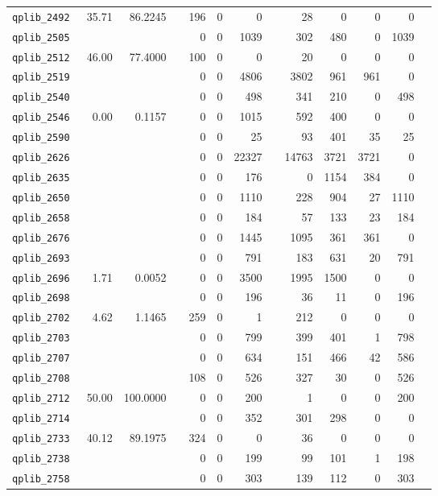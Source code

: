 \begin{longtable}{lrrrrrrrrrrrr}
{\tt 	qplib\_2492	}	&	35.71	&	86.2245	&	&	196	&	0	&	0	&	&	28	&	0	&	0	&	0	\\
{\tt 	qplib\_2505	}	&		&		&	&	0	&	0	&	1039	&	&	302	&	480	&	0	&	1039	\\
{\tt 	qplib\_2512	}	&	46.00	&	77.4000	&	&	100	&	0	&	0	&	&	20	&	0	&	0	&	0	\\
{\tt 	qplib\_2519	}	&		&		&	&	0	&	0	&	4806	&	&	3802	&	961	&	961	&	0	\\
{\tt 	qplib\_2540	}	&		&		&	&	0	&	0	&	498	&	&	341	&	210	&	0	&	498	\\
{\tt 	qplib\_2546	}	&	0.00	&	0.1157	&	&	0	&	0	&	1015	&	&	592	&	400	&	0	&	0	\\
{\tt 	qplib\_2590	}	&		&		&	&	0	&	0	&	25	&	&	93	&	401	&	35	&	25	\\
{\tt 	qplib\_2626	}	&		&		&	&	0	&	0	&	22327	&	&	14763	&	3721	&	3721	&	0	\\
{\tt 	qplib\_2635	}	&		&		&	&	0	&	0	&	176	&	&	0	&	1154	&	384	&	0	\\
{\tt 	qplib\_2650	}	&		&		&	&	0	&	0	&	1110	&	&	228	&	904	&	27	&	1110	\\
{\tt 	qplib\_2658	}	&		&		&	&	0	&	0	&	184	&	&	57	&	133	&	23	&	184	\\
{\tt 	qplib\_2676	}	&		&		&	&	0	&	0	&	1445	&	&	1095	&	361	&	361	&	0	\\
{\tt 	qplib\_2693	}	&		&		&	&	0	&	0	&	791	&	&	183	&	631	&	20	&	791	\\
{\tt 	qplib\_2696	}	&	1.71	&	0.0052	&	&	0	&	0	&	3500	&	&	1995	&	1500	&	0	&	0	\\
{\tt 	qplib\_2698	}	&		&		&	&	0	&	0	&	196	&	&	36	&	11	&	0	&	196	\\
{\tt 	qplib\_2702	}	&	4.62	&	1.1465	&	&	259	&	0	&	1	&	&	212	&	0	&	0	&	0	\\
{\tt 	qplib\_2703	}	&		&		&	&	0	&	0	&	799	&	&	399	&	401	&	1	&	798	\\
{\tt 	qplib\_2707	}	&		&		&	&	0	&	0	&	634	&	&	151	&	466	&	42	&	586	\\
{\tt 	qplib\_2708	}	&		&		&	&	108	&	0	&	526	&	&	327	&	30	&	0	&	526	\\
{\tt 	qplib\_2712	}	&	50.00	&	100.0000	&	&	0	&	0	&	200	&	&	1	&	0	&	0	&	200	\\
{\tt 	qplib\_2714	}	&		&		&	&	0	&	0	&	352	&	&	301	&	298	&	0	&	0	\\
{\tt 	qplib\_2733	}	&	40.12	&	89.1975	&	&	324	&	0	&	0	&	&	36	&	0	&	0	&	0	\\
{\tt 	qplib\_2738	}	&		&		&	&	0	&	0	&	199	&	&	99	&	101	&	1	&	198	\\
{\tt 	qplib\_2758	}	&		&		&	&	0	&	0	&	303	&	&	139	&	112	&	0	&	303	\\

\end{longtable}
